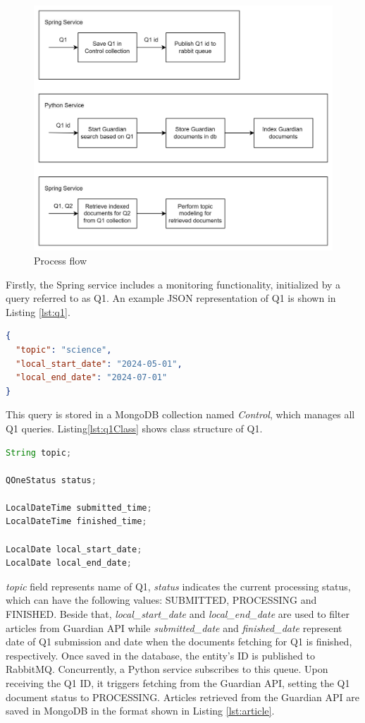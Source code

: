 \begin{figure}
    \centering
    \includegraphics[width=0.7\linewidth] {././figures/diagram}
    \caption{Process flow}
\end{figure}

Firstly, the Spring service includes a monitoring functionality, initialized by a query referred to
as Q1. An example JSON representation of Q1 is shown in Listing \ref{lst:q1}.

\begin{lstlisting}[language=json, caption={JSON representation of Q1}, label={lst:q1}]
{
  "topic": "science",
  "local_start_date": "2024-05-01",
  "local_end_date": "2024-07-01"
}
\end{lstlisting}

This query is stored in a MongoDB collection named \textit{Control}, which manages all Q1 queries.
Listing\ref{lst:q1Class} shows class structure of Q1.

\begin{lstlisting}[language=Java, caption={Class definition of QOne}, label={lst:q1Class}]
String topic;

QOneStatus status;

LocalDateTime submitted_time;
LocalDateTime finished_time;

LocalDate local_start_date;
LocalDate local_end_date;
\end{lstlisting}

\textit{topic} field represents name of Q1, \textit{status} indicates the current processing status,
which can have the following values: SUBMITTED, PROCESSING and FINISHED. Beside that,
\textit{local\_start\_date} and \textit{local\_end\_date} are used to filter articles from Guardian
API while \textit{submitted\_date} and \textit{finished\_date} represent date of Q1 submission and
date when the documents fetching for Q1 is finished, respectively. Once saved in the database, the
entity's ID is published to RabbitMQ.
\newline
Concurrently, a Python service subscribes to this queue. Upon receiving the Q1 ID, it triggers
fetching from the Guardian API, setting the Q1 document status to PROCESSING. Articles retrieved from
the Guardian API are saved in MongoDB in the format shown in Listing \ref{lst:article}.

